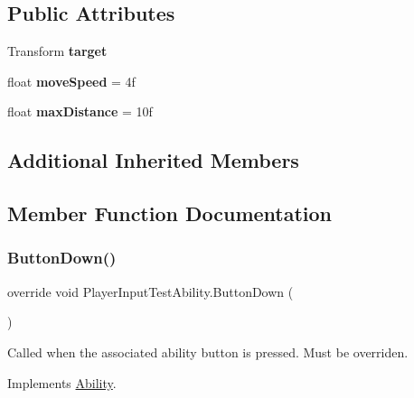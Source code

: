 \subsection*{Public Attributes}
\begin{DoxyCompactItemize}
\item 
\hypertarget{class_player_input_test_ability_a1b2293256407643db311faf5d5940dd9}{}\label{class_player_input_test_ability_a1b2293256407643db311faf5d5940dd9} 
Transform {\bfseries target}
\item 
\hypertarget{class_player_input_test_ability_a959dc56e547abb97c402021861bc228d}{}\label{class_player_input_test_ability_a959dc56e547abb97c402021861bc228d} 
float {\bfseries move\+Speed} = 4f
\item 
\hypertarget{class_player_input_test_ability_ae5db00fdcb49bc09fa10b07a3ee09ee9}{}\label{class_player_input_test_ability_ae5db00fdcb49bc09fa10b07a3ee09ee9} 
float {\bfseries max\+Distance} = 10f
\end{DoxyCompactItemize}
\subsection*{Additional Inherited Members}


\subsection{Member Function Documentation}
\hypertarget{class_player_input_test_ability_a061fe838c77962560b24ff59f2a3dab8}{}\label{class_player_input_test_ability_a061fe838c77962560b24ff59f2a3dab8} 
\subsubsection{\texorpdfstring{Button\+Down()}{ButtonDown()}}
{\footnotesize\ttfamily override void Player\+Input\+Test\+Ability.\+Button\+Down (\begin{DoxyParamCaption}{ }\end{DoxyParamCaption})\hspace{0.3cm}{\ttfamily [virtual]}}



Called when the associated ability button is pressed. Must be overriden. 



Implements \hyperlink{class_ability_a7722265862f8b29828315725415ce266}{Ability}.

